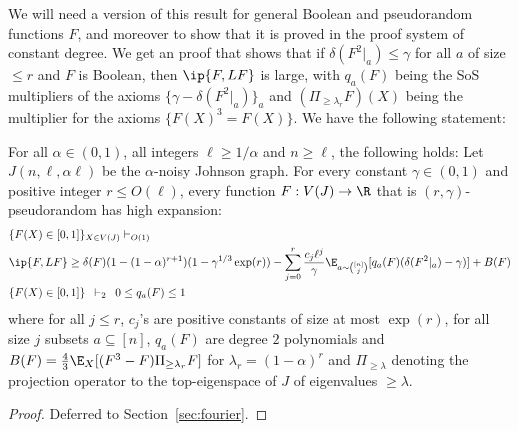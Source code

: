 We will need a version of this 
result for general Boolean and pseudorandom functions $F$, and moreover to show that it is proved in the 
\sos proof system of constant degree. We get an \sos proof that shows that if $\delta(F^2|_a) \leq \gamma$ for all $a$ of size $\leq r$ and $F$ is Boolean, then $\ip{F,LF}$ is large, with $q_a(F)$ being the SoS multipliers of the axioms $\{\gamma - \delta(F^2|_a)\}_a$ and $(\Pi_{\geq \lambda_r}F)(X)$ being the multiplier for the axioms $\{F(X)^3 = F(X)\}$. We have the following statement: 


\begin{theorem}\label{thm:structure-johnson}
For all $\alpha \in (0,1)$, all integers $\ell \geq 1/\alpha$ and $n \geq \ell$, the following holds: Let $J(n,\ell,\alpha \ell)$ be the $\alpha$-noisy Johnson graph. For every constant $\gamma \in (0,1)$ and positive integer $r \leq O(\ell)$, every function $F: V(J) \rightarrow \R$ that is $(r,\gamma)$-pseudorandom has high expansion:
\begin{align}
&\{F(X) \in [0,1]\}_{X \in V(J)}  \vdash_{O(1)}\, \notag\\
&\ip{F,LF} \geq \delta(F)(1 - (1-\alpha)^{r+1})(1- \gamma^{1/3}\exp(r)) - \sum_{j = 0}^r \frac{ c_j\ell^{j}}{\gamma}\E_{a \sim {[n] \choose j}}[q_a(F)({\delta(F^{2}|_a) - \gamma)}]+ B(F) \\
&\{F(X) \in [0,1]\} \,\,\, \vdash_{2} \,\,\, 0 \leq q_a(F) \leq 1 
\end{align}
where for all $j \leq r$, $c_j$'s are positive constants of size at most
$\exp(r)$, for all size $j$ subsets $a \subseteq [n]$, $q_a(F)$ are degree $2$  polynomials and $B(F)=\frac{4}{3}\E_X[(F^{3} - F)\Pi_{\geq \lambda_r}F ]$ for $\lambda_r = (1-\alpha)^r$ and $\Pi_{\geq \lambda}$ denoting the projection operator to the top-eigenspace of $J$ of eigenvalues $\geq \lambda$.
\end{theorem}
\begin{proof}
Deferred to Section~\ref{sec:fourier}.
\end{proof}


